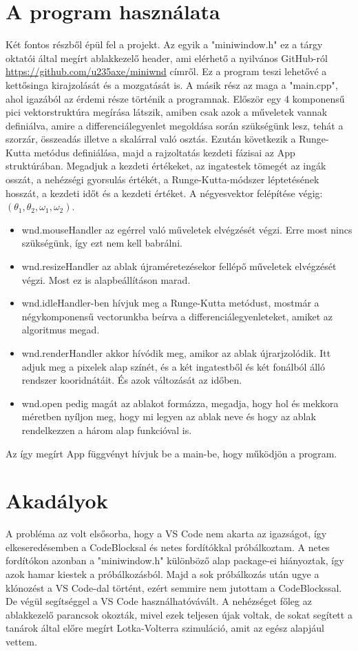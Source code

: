 \documentclass{article}
\begin{document}
\section{A program használata}
Két fontos részből épül fel a projekt. Az egyik a "miniwindow.h" ez a tárgy oktatói által megírt ablakkezelő header, ami elérhető a nyilvános GitHub-ról \url{https://github.com/u235axe/miniwnd} címről. Ez a program teszi lehetővé a kettősinga kirajzolását és a mozgatását is. 
A másik rész az maga a "main.cpp", ahol igazából az érdemi része történik a programnak. Először egy 4 komponensű pici vektorstruktúra megírása látszik, amiben csak azok a műveletek vannak definiálva, amire a differenciálegyenlet megoldása során szükségünk lesz, tehát a szorzár, összeadás illetve a skalárral való osztás.
\newline
Ezután következik a Runge-Kutta metódus definiálása, majd a rajzoltatás kezdeti fázisai az App struktúrában. Megadjuk a kezdeti értékeket, az ingatestek tömegét az ingák osszát, a nehézségi gyorsulás értékét, a Runge-Kutta-módszer léptetésének hosszát, a kezdeti időt és a kezdeti értéket. A négyesvektor felépítése végig: $(\theta_1, \theta_2, \omega_1, \omega_2)$. 
\begin{itemize}
\item wnd.mouseHandler az egérrel való műveletek elvégzését végzi. Erre most nincs szükségünk, így ezt nem kell babrálni.
\item wnd.resizeHandler az ablak újraméretezésekor fellépő műveletek elvégzését végzi. Most ez is alapbeállításon marad.
\item wnd.idleHandler-ben hívjuk meg a Runge-Kutta metódust, mostmár a négykomponensű vectorunkba beírva a differenciálegyenleteket, amiket az algoritmus megad. 
\item wnd.renderHandler akkor hívódik meg, amikor az ablak újrarjzolódik. Itt adjuk meg a pixelek alap színét, és a két ingatestből és két fonálból álló rendszer kooridnátáit. És azok változását az időben.
\item wnd.open pedig magát az ablakot formázza, megadja, hogy hol és mekkora méretben nyíljon meg, hogy mi legyen az ablak neve és hogy az ablak rendelkezzen a három alap funkcióval is. 
\end{itemize}
Az így megírt App függvényt hívjuk be a main-be, hogy működjön a program. 

\section{Akadályok}
A probléma az volt elsősorba, hogy a VS Code nem akarta az igazságot, így elkeseredésemben a CodeBlocksal és netes fordítókkal próbálkoztam. A netes fordítókon azonban a "miniwindow.h" különböző alap package-ei hiányoztak, így azok hamar kiestek a próbálkozásból. Majd a sok próbálkozás után ugye a klónozést a VS Code-dal történt, ezért semmire nem jutottam a CodeBlockssal. De végül segítséggel a VS Code használhatóvávált. 
A nehézséget főleg az ablakkezelő parancsok okozták, mivel ezek teljesen újak voltak, de sokat segített a tanárok által előre megírt Lotka-Volterra szimuláció, amit az egész alapjául vettem.
\end{document}

